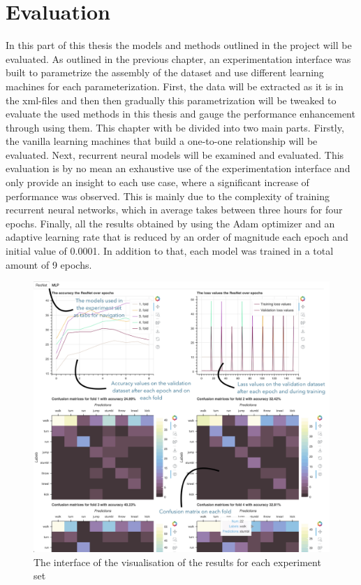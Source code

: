 \chapter{Evaluation}\label{chap:evaluation}
	In this part of this thesis the models and methods outlined in the project will be evaluated. As outlined in the previous chapter, an experimentation interface was built to parametrize the assembly of the dataset and use different learning machines for each parameterization. First, the data will be extracted as it is in the xml-files and then then gradually this parametrization will be tweaked to evaluate the used methods in this thesis and gauge the performance enhancement through using them. This chapter with be divided into two main parts. Firstly, the vanilla learning machines that build a one-to-one relationship will be evaluated. Next, recurrent neural models will be examined and evaluated. This evaluation is by no mean an exhaustive use of the experimentation interface and only provide an insight to each use case, where a significant increase of performance was observed. This is mainly due to the complexity of training recurrent neural networks, which in average takes between three hours for four epochs. Finally, all the results obtained by using the Adam optimizer and an adaptive learning rate that is reduced by an order of magnitude each epoch and initial value of 0.0001. In addition to that, each model was trained in a total amount of 9 epochs.\newline
	\begin{figure}[H]
		\centering
		\includegraphics[width=\textwidth]{img/the-interface-of-the-visualisation-of-the-results-for-each-experiment-set.png}
		\caption{The interface of the visualisation of the results for each experiment set}
		\label{fig:vis_example}
	\end{figure}
